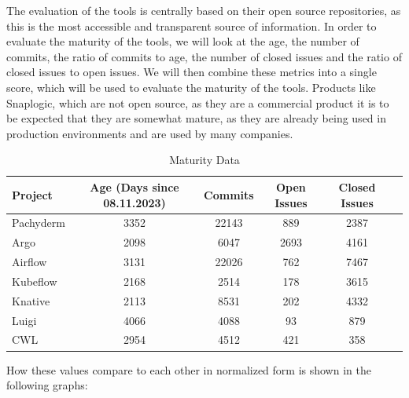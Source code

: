


The evaluation of the tools is centrally based on their open source repositories, as this is the most accessible and transparent source of information.
In order to evaluate the maturity of the tools, we will look at the age, the number of commits, the ratio of commits to age, the number of closed issues and the ratio of closed issues to open issues.
We will then combine these metrics into a single score, which will be used to evaluate the maturity of the tools. Products like Snaplogic, which are not open source,
as they are a commercial product it is to be expected that they are somewhat mature, as they are already being used in production environments and are used by many companies.


\begin{table}[htb]
  \centering
  \label{tab:maturity_data}
  \begin{tabular}{|l|c|c|c|c|c|}
    \hline
    \textbf{Project} & \textbf{Age (Days since 08.11.2023)} & \textbf{Commits} &  \textbf{ Open Issues} & \textbf{Closed Issues} \\
    \hline
    Pachyderm  & 3352 & 22143 & 889 & 2387  \\
    Argo      & 2098 & 6047  & 2693 & 4161 \\
    Airflow    & 3131 & 22026 & 762 & 7467 \\
    Kubeflow   & 2168 & 2514  & 178 & 3615 \\
    Knative    & 2113 & 8531  & 202 & 4332 \\
    Luigi      & 4066 & 4088  & 93  & 879  \\
    CWL        & 2954 & 4512  & 421 & 358  \\
    \hline
 \end{tabular}
 \caption[Maturity Data]{Maturity Data\footnotemark}
\end{table}


How these values compare to each other in normalized form is shown in the following graphs:

